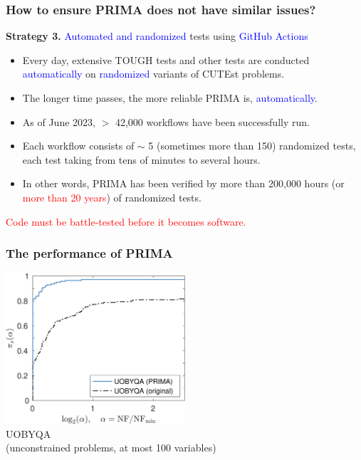 \documentclass[slidestop,mathserif,xcolor=dvipsnames]{beamer}
\newcommand{\blue}[1]{\textcolor{blue}{#1}}
\newcommand{\red}[1]{\textcolor{red}{#1}}
\begin{document}
\begin{frame}
    \frametitle{How to ensure PRIMA does not have similar issues? }

    \vspace{2ex}
    \textbf{Strategy 3.} \blue{Automated and randomized} tests using \blue{GitHub Actions}
    \vspace{1ex}
    \begin{itemize}
        \item Every day, extensive TOUGH tests and other tests are conducted \blue{automatically}
            on \blue{randomized} variants of CUTEst problems.
    \vspace{1ex}
    \item The longer time passes, the more reliable PRIMA is, \blue{automatically}.
    \vspace{1ex}
        \item As of June 2023, $>$ 42,000 workflows have been successfully run.
    \vspace{1ex}
        \item Each workflow consists of $\sim$ 5 (sometimes more than 150) randomized tests,
            each test taking from tens of minutes to several hours.
    \vspace{1ex}
\item In other words, PRIMA has been verified by more than 200,000 hours (or \red{more than 20 years}) of randomized tests.
    \end{itemize}

    \vspace{1ex}
    \begin{center}
    \red{Code must be battle-tested before it becomes software.}
    \end{center}

\end{frame}


\begin{frame}
    \frametitle{The performance of PRIMA}
    \vspace{3ex}
    \begin{center}
    \includegraphics[width=0.5\textwidth]{prima_uobyqa.png}
    \\[2ex]UOBYQA \\[1ex](unconstrained problems, at most 100 variables)
    \end{center}
\end{frame}
\end{document}

